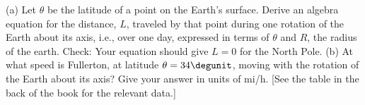  (a) Let $\theta $ be the latitude of a point on the
Earth's surface.  Derive an algebra equation for the
distance, $L$, traveled by that point during one rotation of
the Earth about its axis, i.e., over one day, expressed in
terms of $\theta$ and $R$, the radius of the earth.
Check: Your equation should give $L=0$ for the North Pole.\hwendpart
(b) At what speed is Fullerton, at latitude 
$\theta=34\degunit$, moving with the rotation of the Earth about its
axis?  Give your answer in units of mi/h. [See the table in
the back of the book for the relevant data.]\answercheck

